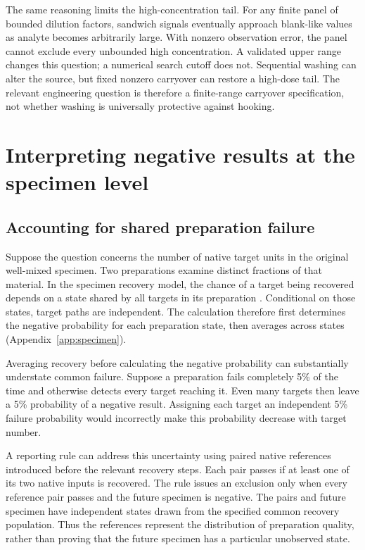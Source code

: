 \documentclass[11pt]{article}
\begin{document}
The same reasoning limits the high-concentration tail. For any finite panel of bounded dilution factors, sandwich signals eventually approach blank-like values as analyte becomes arbitrarily large. With nonzero observation error, the panel cannot exclude every unbounded high concentration. A validated upper range changes this question; a numerical search cutoff does not. Sequential washing can alter the source, but fixed nonzero carryover can restore a high-dose tail. The relevant engineering question is therefore a finite-range carryover specification, not whether washing is universally protective against hooking.

\section{Interpreting negative results at the specimen level}
\subsection{Accounting for shared preparation failure}
Suppose the question concerns the number of native target units in the original well-mixed specimen. Two preparations examine distinct fractions of that material. In the specimen recovery model, the chance of a target being recovered depends on a state shared by all targets in its preparation \citep{S}. Conditional on those states, target paths are independent. The calculation therefore first determines the negative probability for each preparation state, then averages across states (Appendix~\ref{app:specimen}).

Averaging recovery before calculating the negative probability can substantially understate common failure. Suppose a preparation fails completely 5\% of the time and otherwise detects every target reaching it. Even many targets then leave a 5\% probability of a negative result. Assigning each target an independent 5\% failure probability would incorrectly make this probability decrease with target number.

A reporting rule can address this uncertainty using paired native references introduced before the relevant recovery steps. Each pair passes if at least one of its two native inputs is recovered. The rule issues an exclusion only when every reference pair passes and the future specimen is negative. The pairs and future specimen have independent states drawn from the specified common recovery population. Thus the references represent the distribution of preparation quality, rather than proving that the future specimen has a particular unobserved state.
\end{document}
